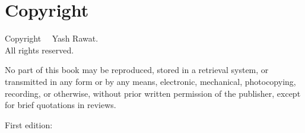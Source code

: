 \chapter*{Copyright}

\noindent Copyright \textcopyright\ \the\year\ Yash Rawat.\\
All rights reserved.

\vspace{1em}
\noindent No part of this book may be reproduced, stored in a retrieval system,
or transmitted in any form or by any means, electronic, mechanical,
photocopying, recording, or otherwise, without prior written permission
of the publisher, except for brief quotations in reviews.

\vspace{1em}
\noindent First edition: \the\year
